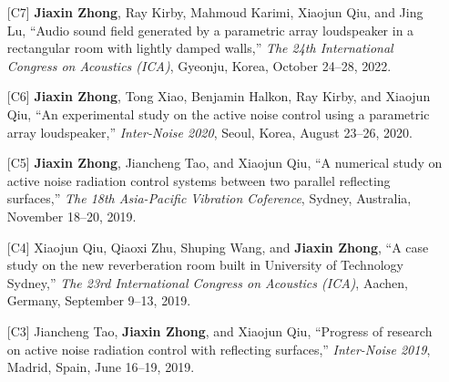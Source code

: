 \documentclass[10pt,a4paper,ragged2e,withhyper]{altacv}
\newcommand{\PubConference}[1]{\textit{#1}}
\newcommand{\PubTitle}[1]{``{#1,}''}
\newcommand{\PubMe}[1]{\textbf{#1}}
\begin{document}
\begin{paracol}{1}
\divider

\newpage
{}

\begin{itemize}[leftmargin = 25pt]
    \item[{[C7]}] 
        \PubMe{Jiaxin Zhong}, Ray Kirby, Mahmoud Karimi, Xiaojun Qiu, and Jing Lu,
        \PubTitle{Audio sound field generated by a parametric array loudspeaker in a rectangular room with lightly damped walls}
        \PubConference{The 24th International Congress on Acoustics (ICA)},
        Gyeonju, Korea, October 24--28, 2022.
        \href{https://github.com/JiaxinZhong/JiaxinZhong.github.io/raw/master/publications/conference/Zhong2022-ICA-PAL_room.pdf}{\color{accent}\faFilePdf[regular]}

    \item[{[C6]}] \PubMe{Jiaxin Zhong}, Tong Xiao, Benjamin Halkon, Ray Kirby, and Xiaojun Qiu,
        \PubTitle{An experimental study on the active noise control using a parametric array loudspeaker}
        \PubConference{Inter-Noise 2020},
        Seoul, Korea,
        August 23--26, 2020.
        \href{https://github.com/JiaxinZhong/JiaxinZhong.github.io/raw/master/publications/conference/Zhong2020-Internoise-PAL_ANC.pdf}{\color{accent}\faFilePdf[regular]}

    \item[{[C5]}] \PubMe{Jiaxin Zhong}, Jiancheng Tao, and Xiaojun Qiu,
        \PubTitle{A numerical study on active noise radiation control systems between two parallel reflecting surfaces}
        \PubConference{The 18th Asia-Pacific Vibration Coference},
        Sydney, Australia, 
        November 18--20, 2019.
        \href{https://github.com/JiaxinZhong/JiaxinZhong.github.io/raw/master/publications/conference/Zhong2019-APVC-ANC_parallel_surface.pdf}{\color{accent}\faFilePdf[regular]}

    \item[{[C4]}] Xiaojun Qiu, Qiaoxi Zhu, Shuping Wang, and \PubMe{Jiaxin Zhong},
        \PubTitle{A case study on the new reverberation room built in University of Technology Sydney}
        \PubConference{The 23rd International Congress on Acoustics (ICA)},
        Aachen, Germany, 
        September 9--13, 2019.
        \href{https://github.com/JiaxinZhong/JiaxinZhong.github.io/raw/master/publications/conference/Qiu2019-ICA-Reverberation_room_UTS.pdf}{\color{accent}\faFilePdf[regular]}

    \item[{[C3]}] Jiancheng Tao, \PubMe{Jiaxin Zhong}, and Xiaojun Qiu,
        \PubTitle{Progress of research on active noise radiation control with reflecting surfaces}
        \PubConference{Inter-Noise 2019},
        Madrid, Spain, 
        June 16--19, 2019.
        \href{https://github.com/JiaxinZhong/JiaxinZhong.github.io/raw/master/publications/conference/Tao2019-Internoise-ANC_surface.pdf}{\color{accent}\faFilePdf[regular]}


\end{itemize}
\end{paracol}
\end{document}
